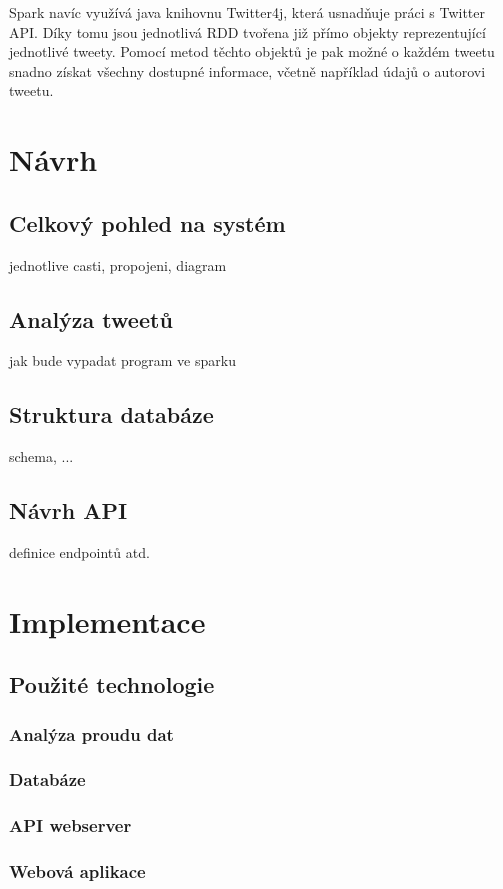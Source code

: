 \documentclass[thesis=B,czech]{FITthesis}[2012/06/26]
\begin{document}
	Spark navíc využívá java knihovnu Twitter4j\cite{twitter4j}, která usnadňuje práci s Twitter API. Díky tomu jsou jednotlivá RDD tvořena již přímo objekty reprezentující jednotlivé tweety. Pomocí metod těchto objektů je pak možné o každém tweetu snadno získat všechny dostupné informace, včetně například údajů o autorovi tweetu. 


\chapter{Návrh}
\section{Celkový pohled na systém}
	jednotlive casti, propojeni, diagram 
\section{Analýza tweetů}
	jak bude vypadat program ve sparku
\section{Struktura databáze}
	schema, ...
\section{Návrh API}
	definice endpointů atd.

\chapter{Implementace}
\section{Použité technologie}
\subsection{Analýza proudu dat}
\subsection{Databáze}
\subsection{API webserver}
\subsection{Webová aplikace}
\end{document}
